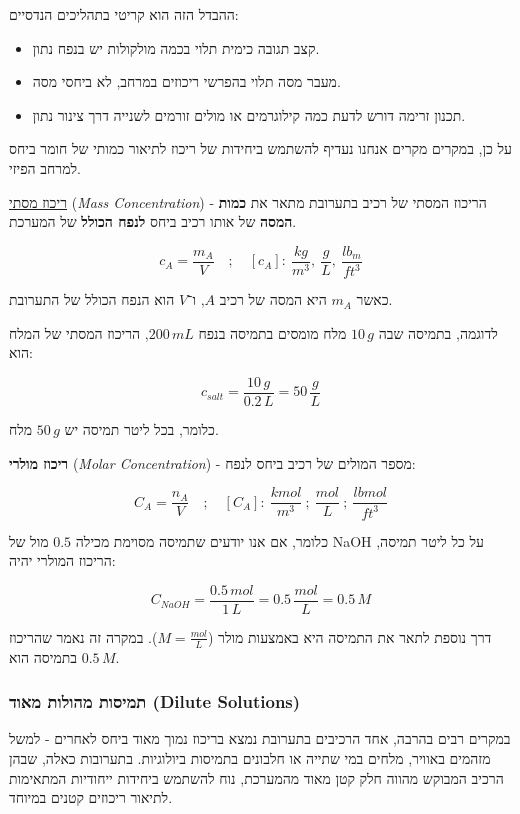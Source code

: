 \documentclass[
  hebrew,
  letterpaper,
  DIV=11,
  numbers=noendperiod]{scrreprt}
\begin{document}
{ההבדל הזה הוא קריטי בתהליכים הנדסיים}:

\begin{itemize}
\item
  {קצב תגובה כימית תלוי בכמה מולקולות יש בנפח נתון}.
\item
  {מעבר מסה תלוי בהפרשי ריכוזים במרחב, לא ביחסי מסה}.
\item
  {תכנון זרימה דורש לדעת כמה קילוגרמים או מולים זורמים לשנייה דרך צינור
  נתון}.
\end{itemize}

{על כן, במקרים מקרים אנחנו נעדיף להשתמש ביחידות של ריכוז לתיאור כמותי של
חומר ביחס למרחב הפיזי}.

\ul{ריכוז מסתי} (\emph{Mass Concentration}) - הריכוז המסתי של רכיב
בתערובת מתאר את \textbf{כמות המסה} של אותו רכיב ביחס \textbf{לנפח הכולל}
של המערכת.

\[
c_{A} = \frac{m_{A}}{V} \quad ; \quad [c_{A}]: \ \frac{kg}{m^{3}},\ \frac{g}{L},\ \frac{lb_{m}}{ft^{3}}
\]

כאשר \(m_{A}\) היא המסה של רכיב \(A\), ו־\(V\) הוא הנפח הכולל של
התערובת.

לדוגמה, בתמיסה שבה \(10\,g\) מלח מומסים בתמיסה בנפח \(200\,mL\), הריכוז
המסתי של המלח הוא:

\[
c_{salt} = \frac{10\,g}{0.2\,L} = 50\,\frac{g}{L}
\]

כלומר, בכל ליטר תמיסה יש \(50\,g\) מלח.

\textbf{ריכוז מולרי} (\emph{Molar Concentration}) - מספר המולים של רכיב
ביחס לנפח:

\[
C_{A} = \frac{n_{A}}{V} \quad ; \quad [C_{A}]:\ \frac{kmol}{m^{3}}\ ;\ \frac{mol}{L}\ ;\ \frac{lbmol}{ft^{3}}
\]

כלומר, אם אנו יודעים שתמיסה מסוימת מכילה \(0.5\) מול של NaOH על כל ליטר
תמיסה, הריכוז המולרי יהיה:

\[
C_{NaOH} = \frac{0.5\,mol}{1\,L} = 0.5\,\frac{mol}{L} = 0.5\,M
\]

דרך נוספת לתאר את התמיסה היא באמצעות מולר (\(M = \frac{mol}{L}\)). במקרה
זה נאמר שהריכוז בתמיסה הוא \(0.5\,M\).

\subsubsection{\texorpdfstring{{תמיסות מהולות מאוד} (Dilute
Solutions)}{תמיסות מהולות מאוד (Dilute Solutions)}}\label{ux5eaux5deux5d9ux5e1ux5d5ux5ea-ux5deux5d4ux5d5ux5dcux5d5ux5ea-ux5deux5d0ux5d5ux5d3-dilute-solutions}

{במקרים רבים בהרבה, אחד הרכיבים בתערובת נמצא בריכוז נמוך מאוד ביחס
לאחרים - למשל מזהמים באוויר, מלחים במי שתייה או חלבונים בתמיסות
ביולוגיות}. {בתערובות כאלה, שבהן הרכיב המבוקש מהווה חלק קטן מאוד
מהמערכת, נוח להשתמש ביחידות ייחודיות המתאימות לתיאור ריכוזים קטנים
במיוחד}. {}
\end{document}
